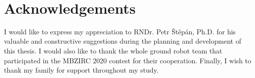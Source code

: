~\vfill{}

\section*{Acknowledgements}

I would like to express my appreciation to RNDr. Petr Štěpán, Ph.D. for his valuable and constructive suggestions during the planning and development of this thesis. I would also like to thank the whole ground robot team that participated in the MBZIRC 2020 contest for their cooperation. Finally, I wish to thank my family for support throughout my study.

\vspace{2.5cm}

\newpage{}

